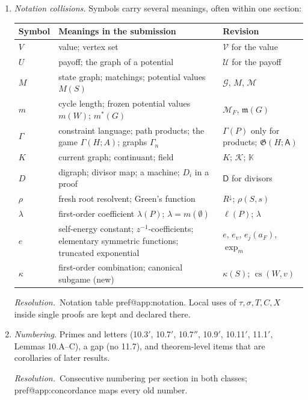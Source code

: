 \documentclass[11pt]{amsart}
\makeatletter
\newcommand{\pref}[1]{\csname pref@#1\endcsname}
\newcommand{\fix}{\par\noindent\emph{Resolution.}\ }
\makeatother
\begin{document}
\begin{enumerate}[label=\textbf{III.\arabic*},leftmargin=*,widest=III.8]
\item \emph{Notation collisions.} Symbols carry several meanings, often within one section:
\begin{center}\small
\begin{longtable}{@{}p{1.3cm}p{8.4cm}p{4.6cm}@{}}
\toprule
Symbol & Meanings in the submission & Revision\\ \midrule\endhead
$V$ & value; vertex set & $\mathcal V$ for the value\\
$U$ & payoff; the graph of a potential & $\mathcal U$ for the payoff\\
$M$ & state graph; matchings; potential values $M(S)$ & $\mathcal G$, $M$, $\mathcal M$\\
$m$ & cycle length; frozen potential values $m(W)$; $m^*(G)$ & $\mathcal M_F$, $\mathfrak m(G)$\\
$\Gamma$ & constraint language; path products; the game $\Gamma(H;A)$; graphs $\Gamma_n$ & $\Gamma(P)$ only for products; $\mathfrak G(H;\mathsf A)$\\
$K$ & current graph; continuant; field & $K$; $\mathcal K$; $\mathbb K$\\
$D$ & digraph; divisor map; a machine; $D_i$ in a proof & $\mathsf D$ for divisors\\
$\rho$ & fresh root resolvent; Green's function & $R^{\downarrow}$; $\rho(S,s)$\\
$\lambda$ & first-order coefficient $\lambda(P)$; $\lambda=m(\emptyset)$ & $\ell(P)$; $\lambda$\\
$e$ & self-energy constant; $z^{-1}$-coefficients; elementary symmetric functions; truncated exponential & $e$, $e_v$, $e_j(a_F)$, $\exp_m$\\
$\kappa$ & first-order combination; canonical subgame (new) & $\kappa(S)$; $\operatorname{cs}(W,v)$\\
\bottomrule
\end{longtable}
\end{center}
\fix Notation table \pref{app:notation}. Local uses of $\tau,\sigma,T,C,X$ inside single proofs are kept and declared there.

\item \emph{Numbering.} Primes and letters (10.3$'$, 10.7$'$, 10.7$''$, 10.9$'$, 10.11$'$, 11.1$'$, Lemmas 10.A--C), a gap (no 11.7), and theorem-level items that are corollaries of later results.
\fix Consecutive numbering per section in both classes; \pref{app:concordance} maps every old number.


\end{enumerate}
\end{document}

